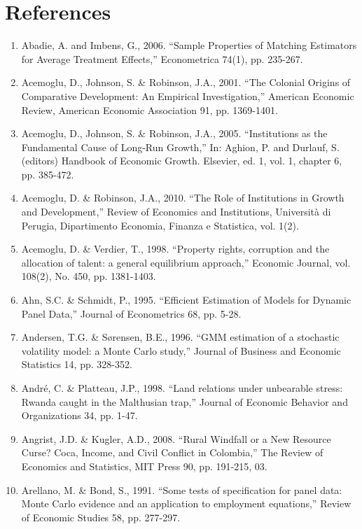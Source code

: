 \section*{References}
\begin{enumerate} \footnotesize
\item Abadie, A. and Imbens, G., 2006. ``Sample Properties of Matching Estimators for Average Treatment Effects,'' Econometrica 74(1), pp. 235-267.
\item  Acemoglu, D., Johnson, S. \& Robinson, J.A., 2001. ``The Colonial Origins of Comparative Development: An Empirical Investigation,'' American Economic Review, American Economic Association 91, pp. 1369-1401.
\item Acemoglu, D., Johnson, S. \& Robinson, J.A., 2005. ``Institutions as the Fundamental Cause of Long-Run Growth,'' In: Aghion, P. and Durlauf, S. (editors) Handbook of Economic Growth. Elsevier, ed. 1, vol. 1, chapter 6, pp. 385-472.
\item Acemoglu, D. \& Robinson, J.A., 2010. ``The Role of Institutions in Growth and Development,'' Review of Economics and Institutions, Universit\`{a} di Perugia, Dipartimento Economia, Finanza e Statistica, vol. 1(2).
\item Acemoglu, D. \& Verdier, T., 1998. ``Property rights, corruption and the allocation of talent: a general equilibrium approach,'' Economic Journal, vol. 108(2), No. 450, pp. 1381-1403.
\item Ahn, S.C. \& Schmidt, P., 1995. ``Efficient Estimation of Models for Dynamic Panel Data,'' Journal of Econometrics 68, pp. 5-28.

\item Andersen, T.G. \& S\o rensen, B.E., 1996. ``GMM estimation of a stochastic volatility model: a Monte Carlo study,'' Journal of Business and Economic Statistics 14, pp. 328-352.

\item Andr\'{e}, C. \& Platteau, J.P., 1998. ``Land relations under unbearable stress: Rwanda caught in the Malthusian trap,'' Journal of Economic Behavior and Organizations 34, pp. 1-47.

\item Angrist, J.D. \& Kugler, A.D., 2008. ``Rural Windfall or a New Resource Curse? Coca, Income, and Civil Conflict in Colombia,'' The Review of Economics and Statistics, MIT Press 90, pp. 191-215, 03.

\item Arellano, M. \& Bond, S., 1991. ``Some tests of specification for panel data: Monte Carlo evidence and an application to employment equations,'' Review of Economic Studies 58, pp. 277-297.


\end{enumerate}
